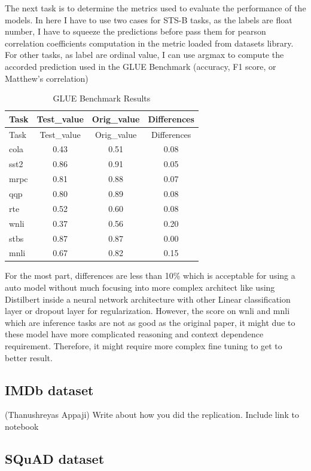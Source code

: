 \documentclass[
  11pt,
]{article}
\begin{document}
The next task is to determine the metrics used to evaluate the
performance of the models. In here I have to use two cases for STS-B
tasks, as the labels are float number, I have to squeeze the predictions
before pass them for pearson correlation coefficients computation in the
metric loaded from datasets library. For other tasks, as label are
ordinal value, I can use argmax to compute the accorded prediction used
in the GLUE Benchmark (accuracy, F1 score, or Matthew's correlation)

\begin{longtable}[]{@{}lccc@{}}
\caption{GLUE Benchmark Results}\tabularnewline
\toprule\noalign{}
Task & Test\_value & Orig\_value & Differences \\
\midrule\noalign{}
\endfirsthead
\toprule\noalign{}
Task & Test\_value & Orig\_value & Differences \\
\midrule\noalign{}
\endhead
\bottomrule\noalign{}
\endlastfoot
cola & 0.43 & 0.51 & 0.08 \\
sst2 & 0.86 & 0.91 & 0.05 \\
mrpc & 0.81 & 0.88 & 0.07 \\
qqp & 0.80 & 0.89 & 0.08 \\
rte & 0.52 & 0.60 & 0.08 \\
wnli & 0.37 & 0.56 & 0.20 \\
stbs & 0.87 & 0.87 & 0.00 \\
mnli & 0.67 & 0.82 & 0.15 \\
\end{longtable}

For the most part, differences are less than 10\% which is acceptable
for using a auto model without much focusing into more complex architect
like using Distilbert inside a neural network architecture with other
Linear classification layer or dropout layer for regularization.
However, the score on wnli and mnli which are inference tasks are not as
good as the original paper, it might due to these model have more
complicated reasoning and context dependence requirement. Therefore, it
might require more complex fine tuning to get to better result.

\subsection{IMDb dataset}\label{imdb-dataset-1}

(Thanushreyas Appaji) Write about how you did the replication. Include
link to notebook

\subsection{SQuAD dataset}\label{squad-dataset-1}
\end{document}
